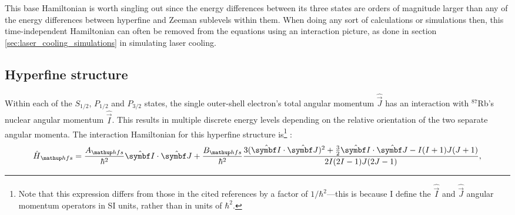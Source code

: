 This base Hamiltonian is worth singling out since the energy differences between its three states are orders of magnitude larger than any of the energy differences between hyperfine and Zeeman sublevels within them. When doing any sort of calculations or simulations then, this time-independent Hamiltonian can often be removed from the equations using an interaction picture, as done in section \ref{sec:laser_cooling_simulations} in simulating laser cooling. 

\subsection{Hyperfine structure}

Within each of the $S_{1/2}$, $P_{1/2}$ and $P_{3/2}$ states, the single outer-shell electron's total angular momentum $\hat {\vec J}$ has an interaction with $^{87}$Rb's nuclear angular momentum $\hat{\vec I}$. This results in multiple discrete energy levels depending on the relative orientation of the two separate angular momenta. The interaction Hamiltonian for this hyperfine structure is\footnote{Note that this expression differs from those in the cited references by a factor of $1/\hbar^2$---this is because I define the $\hat{\vec I}$ and $\hat{\vec J}$ angular momentum operators in SI units, rather than in units of $\hbar^2$.} \cite{steck_rubidium_2015, arimondo_experimental_1977}:
\begin{align}\label{eq:H_hfs}
\hat H_\up{hfs} = \frac{A_\up{hfs}}{\hbar^2} \hat{\vec I} \cdot \hat {\vec J}
+ \frac{B_\up{hfs}}{\hbar^2}\frac
{3(\hat{\vec I}\cdot\hat{\vec J})^2 + \frac32 \hat{\vec I}\cdot\hat{\vec J} - I(I + 1)J(J + 1)}
{2I(2I - 1)J(2J - 1)},
\end{align}
